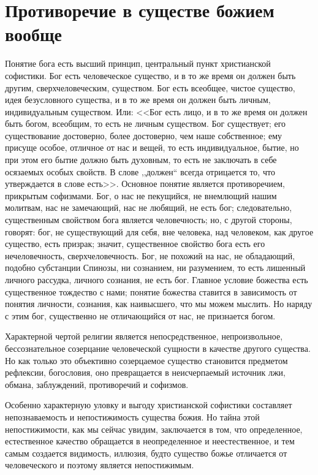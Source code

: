 \documentclass[12pt,oneside]{book}
\begin{document}
\chapter{Противоречие в существе божием вообще}


Понятие бога есть высший принцип, центральный пункт христианской софистики. Бог есть человеческое существо, и в то же время он должен быть другим, сверхчеловеческим, существом. Бог есть всеобщее, чистое существо, идея безусловного существа, и в то же время он должен быть личным, индивидуальным существом. Или: <<Бог есть лицо, и в то же время он должен быть богом, всеобщим, то есть не личным существом. Бог существует; его существование достоверно, более достоверно, чем наше собственное; ему присуще особое, отличное от нас и вещей, то есть индивидуальное, бытие, но при этом его бытие должно быть духовным, то есть не заключать в себе осязаемых особых свойств. В слове ,,должен`` всегда отрицается то, что утверждается в слове есть>>. Основное понятие является противоречием, прикрытым софизмами. Бог, о нас не пекущийся, не внемлющий нашим молитвам, нас не замечающий, нас не любящий, не есть бог; следовательно, существенным свойством бога является человечность; но, с другой стороны, говорят: бог, не существующий для себя, вне человека, над человеком, как другое существо, есть призрак; значит, существенное свойство бога есть его нечеловечность, сверхчеловечность. Бог, не похожий на нас, не обладающий, подобно субстанции Спинозы, ни сознанием, ни разумением, то есть лишенный личного рассудка, личного сознания, не есть бог. Главное условие божества есть существенное тождество с нами; понятие божества ставится в зависимость от понятия личности, сознания, как наивысшего, что мы можем мыслить. Но наряду с этим бог, существенно не отличающийся от нас, не признается богом.

Характерной чертой религии является непосредственное, непроизвольное, бессознательное созерцание человеческой сущности в качестве другого существа. Но как только это объективно созерцаемое существо становится предметом рефлексии, богословия, оно превращается в неисчерпаемый источник лжи, обмана, заблуждений, противоречий и софизмов.

Особенно характерную уловку и выгоду христианской софистики составляет непознаваемость и непостижимость существа божия. Но тайна этой непостижимости, как мы сейчас увидим, заключается в том, что определенное, естественное качество обращается в неопределенное и неестественное, и тем самым создается видимость, иллюзия, будто существо божье отличается от человеческого и поэтому является непостижимым.
\end{document}
